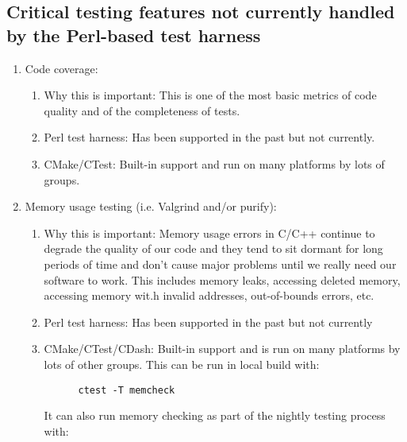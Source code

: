 \documentclass[pdf,ps2pdf,11pt]{SANDreport}
\begin{document}
%
{}\subsection{Critical testing features not currently handled by the
Perl-based test harness}
%

\begin{enumerate}

{}\item Code coverage:

  \begin{enumerate}

  {}\item Why this is important: This is one of the most basic
  metrics of code quality and of the completeness of tests.

  {}\item Perl test harness: Has been supported in the past but not
  currently.

  {}\item CMake/CTest: Built-in support and run on many platforms by
  lots of groups.

  \end{enumerate}

{}\item Memory usage testing (i.e. Valgrind and/or purify):

  \begin{enumerate}

  {}\item Why this is important: Memory usage errors in C/C++
  continue to degrade the quality of our code and they tend to sit
  dormant for long periods of time and don't cause major problems
  until we really need our software to work.  This includes memory
  leaks, accessing deleted memory, accessing memory wit.h invalid
  addresses, out-of-bounds errors, etc.

  {}\item Perl test harness: Has been supported in the past but not
  currently

  {}\item CMake/CTest/CDash: Built-in support and is run on many
  platforms by lots of other groups.  This can be run in local build
  with:

    \begin{verbatim}
      ctest -T memcheck
    \end{verbatim}

  It can also run memory checking as part of the nightly testing
  process with:


\end{enumerate}
\end{enumerate}
\end{document}
